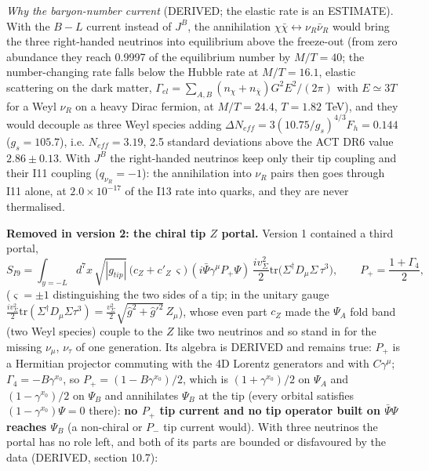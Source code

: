 \documentclass[
  10pt,
]{article}
\begin{document}
\emph{Why the baryon-number current} (DERIVED; the elastic rate is an
ESTIMATE). With the \(B - L\) current instead of \(J^B\), the
annihilation \(\chi\bar\chi \leftrightarrow \nu_R\bar\nu_R\) would bring
the three right-handed neutrinos into equilibrium above the freeze-out
(from zero abundance they reach 0.9997 of the equilibrium number by
\(M/T = 40\); the number-changing rate falls below the Hubble rate at
\(M/T = 16.1\), elastic scattering on the dark matter,
\(\Gamma_{el} = \sum_{A,B}(n_\chi + n_{\bar\chi})G^2E^2/(2\pi)\) with
\(E \simeq 3T\) for a Weyl \(\nu_R\) on a heavy Dirac fermion, at
\(M/T = 24.4\), \(T = 1.82\) TeV), and they would decouple as three Weyl
species adding \(\Delta N_{eff} = 3(10.75/g_s)^{4/3}F_h = 0.144\)
(\(g_s = 105.7\)), i.e. \(N_{eff} = 3.19\), 2.5 standard deviations
above the ACT DR6 value \(2.86 \pm 0.13\). With \(J^B\) the right-handed
neutrinos keep only their tip coupling and their I11 coupling
(\(q_{\nu_R} = -1\)): the annihilation into \(\nu_R\) pairs then goes
through I11 alone, at \(2.0\times10^{-17}\) of the I13 rate into quarks,
and they are never thermalised.

\textbf{Removed in version 2: the chiral tip \(Z\) portal.} Version 1
contained a third portal,
\[ S_{I9} = \int_{y=-L} d^7x\,\sqrt{|g_{tip}|}\,\big(c_Z + c'_Z\,\varsigma\big)\,(i\bar\Psi\gamma^\mu P_+\Psi)\,
   \frac{i v_\Sigma^2}{2}\mathrm{tr}\big(\Sigma^\dagger D_\mu\Sigma\,\tau^3\big),\qquad P_+ = \frac{1 + \Gamma_4}{2}, \]
(\(\varsigma = \pm1\) distinguishing the two sides of a tip; in the
unitary gauge
\(\frac{iv_\Sigma^2}{2}\mathrm{tr}(\Sigma^\dagger D_\mu\Sigma\tau^3) = \frac{v_\Sigma^2}{2}\sqrt{\hat g^2 + \hat g'^2}\,Z_\mu\)),
whose even part \(c_Z\) made the \(\Psi_A\) fold band (two Weyl species)
couple to the \(Z\) like two neutrinos and so stand in for the missing
\(\nu_\mu\), \(\nu_\tau\) of one generation. Its algebra is DERIVED and
remains true: \(P_+\) is a Hermitian projector commuting with the 4D
Lorentz generators and with \(C\gamma^\mu\);
\(\Gamma_4 = -B\gamma^{x_0}\), so \(P_+ = (1 - B\gamma^{x_0})/2\), which
is \((1 + \gamma^{x_0})/2\) on \(\Psi_A\) and \((1 - \gamma^{x_0})/2\)
on \(\Psi_B\) and annihilates \(\Psi_B\) at the tip (every orbital
satisfies \((1 - \gamma^{x_0})\Psi = 0\) there): \textbf{no \(P_+\) tip
current and no tip operator built on \(\bar\Psi\Psi\) reaches
\(\Psi_B\)} (a non-chiral or \(P_-\) tip current would). With three
neutrinos the portal has no role left, and both of its parts are bounded
or disfavoured by the data (DERIVED, section 10.7):
\end{document}

